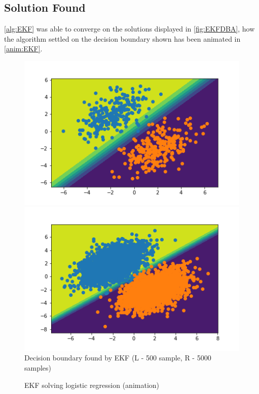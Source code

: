 \documentclass[sigconf]{acmart}
\begin{document}
\subsection{Solution Found}
\autoref{alg:EKF} was able to converge on the solutions displayed in \autoref{fig:EKFDBA}, how the algorithm settled on the decision boundary shown has been animated in \autoref{anim:EKF}.
\begin{figure}[!h]
  \begin{minipage}[b]{0.4\textwidth}
    \includegraphics[scale=0.5]{../Part 2/DecisionBoundary1.png}
  \end{minipage}
  \hfill
  \begin{minipage}[b]{0.4\textwidth}
    \includegraphics[scale=0.5]{../Part 2/DecisionBoundaryL.png}
  \end{minipage}
  \caption{Decision boundary found by EKF (L - 500 sample, R - 5000 samples)}
  \label{fig:EKFDBA}
\end{figure}

\begin{figure}[h]
  \centering
  \caption{EKF solving logistic regression (animation)}
  \label{anim:EKF}
\end{figure}
\end{document}
